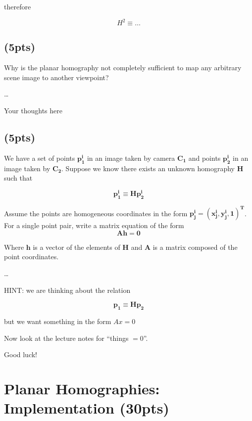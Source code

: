 \documentclass[12pt]{article}
\begin{document}
therefore

\begin{equation}
  H^2 \equiv \ldots
\end{equation}


\subsection{(5pts)}

Why is the planar homography not completely sufficient to map any arbitrary scene image to another viewpoint?

\ldots

{Your thoughts here}



\subsection{(5pts)}

We have a set of points $\bm{p^i_1}$ in an image taken by camera $\bm{C_1}$ and points $\bm{p^i_2}$ in an image taken by
$\bm{C_2}$. Suppose we know there exists an unknown homography $\bm{H}$ such that

\begin{equation}
\bm{p^i_1 \equiv Hp^i_2}
\end{equation}

Assume the points are homogeneous coordinates in the form $\bm{p^i_j = (x^i_j,y^i_j,1)^T}$. For a single point pair, write a matrix
equation of the form
\begin{equation}
  \bm{Ah = 0}
\end{equation}

Where $\bm{h}$ is a vector of the elements of $\bm{H}$ and $\bm{A}$ is a matrix composed of the point coordinates.

\ldots

HINT: we are thinking about the relation

\begin{equation}
\bm{p_1 \equiv Hp_2}
\end{equation}

but we want something in the form $Ax = 0$

Now look at the lecture notes for ``things $=0$''.

Good luck!


\section{Planar Homographies: Implementation (30pts)}
\end{document}
